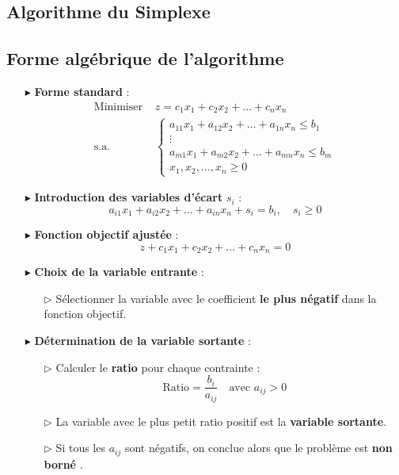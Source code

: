 \documentclass{report}
\begin{document}
\setcounter{page}{1}
\pagestyle{plain}

\begin{multicols*}{2}
\chapter{Algorithme du Simplexe}
\section{Forme algébrique de l'algorithme}
\begin{itemize}
    \item[$\blacktriangleright$] \textbf{Forme standard} :
    \begin{align*}
        \text{Minimiser } & z = c_1x_1 + c_2x_2 + \dots + c_nx_n \\
        \text{s.a. } &
        \begin{cases}
            a_{11}x_1 + a_{12}x_2 + \dots + a_{1n}x_n \leq b_1 \\
            \vdots \\
            a_{m1}x_1 + a_{m2}x_2 + \dots + a_{mn}x_n \leq b_m \\
            x_1, x_2, \dots, x_n \geq 0
        \end{cases}
    \end{align*}

    \item[$\blacktriangleright$] \textbf{Introduction des variables d'écart} $s_i$ :
    \[
    a_{i1}x_1 + a_{i2}x_2 + \dots + a_{in}x_n + s_i = b_i, \quad s_i \geq 0
    \]

    \item[$\blacktriangleright$] \textbf{Fonction objectif ajustée} :
    \[
    z + c_1x_1 + c_2x_2 + \dots + c_nx_n = 0
    \]

    \item[$\blacktriangleright$] \textbf{Choix de la variable entrante} :
    \begin{itemize}
        \item[$\rhd$] Sélectionner la variable avec le coefficient \textbf{le plus négatif} dans la fonction objectif.
    \end{itemize}

    \item[$\blacktriangleright$] \textbf{Détermination de la variable sortante} :
    \begin{itemize}
        \item[$\rhd$] Calculer le \textbf{ratio} pour chaque contrainte :
        \[
        \boxed{\text{Ratio} = \dfrac{b_i}{a_{ij}}} \quad \text{avec } a_{ij} > 0
        \]
        \item[$\rhd$] La variable avec le plus petit ratio positif est la \textbf{variable sortante}.
        \item[$\rhd$] Si tous les $a_{ij}$ sont négatifs, on conclue 
            alors que le problème est \textbf{non borné}                        .
    \end{itemize}


\end{itemize}
\end{multicols*}
\end{document}
